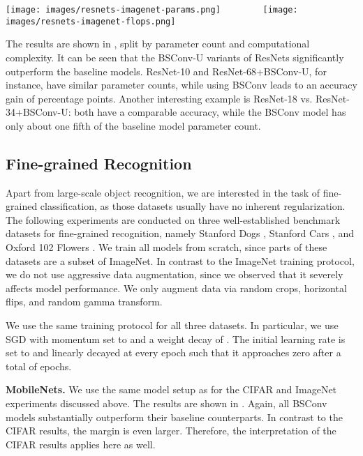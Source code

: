 \documentclass[10pt,twocolumn,letterpaper]{article}
\newcommand{\DCCK}{BSConv\xspace}
\newcommand{\DCCKU}{\DCCK-U\xspace}
\begin{document}
\begin{figure*}
	\center
	\texttt{[image: images/resnets-imagenet-params.png]}~~~~~~~~
	\texttt{[image: images/resnets-imagenet-flops.png]}
	\caption{ResNets on ImageNet.
		For the baseline models, we use ResNet-10/18/26.
		The \DCCK variants are ResNet-10/18/34/68/102.
	}
     \label{fig:resnetsImagenetParamsAndFlops}
\end{figure*}

The results are shown in , split by parameter count and computational complexity.
It can be seen that the \DCCKU variants of ResNets significantly outperform the baseline models.
ResNet-10 and \mbox{ResNet-68+\DCCKU}, for instance, have similar parameter counts, while using \DCCK leads to an accuracy gain of  percentage points.
Another interesting example is ResNet-18 vs. \mbox{ResNet-34+\DCCKU}: both have a comparable accuracy, while the \DCCK model has only about one fifth of the baseline model parameter count.

\subsection{Fine-grained Recognition}
Apart from large-scale object recognition, we are interested in the task of fine-grained classification, as those datasets usually have no inherent regularization.
The following experiments are conducted on three well-established benchmark datasets for fine-grained recognition, namely Stanford Dogs \cite{Khosla2011dogs}, Stanford Cars \cite{KrauseStarkDengFei-Fei_3DRR2013}, and Oxford 102 Flowers \cite{nilsback2008automated}.
We train all models from scratch, since parts of these datasets are a subset of ImageNet.
In contrast to the ImageNet training protocol, we do not use aggressive data augmentation, since we observed that it severely affects model performance.
We only augment data via random crops, horizontal flips, and random gamma transform.

We use the same training protocol for all three datasets.
In particular, we use SGD with momentum set to  and a weight decay of .
The initial learning rate is set to  and linearly decayed at every epoch such that it approaches zero after a total of  epochs.

\textbf{MobileNets.}
We use the same model setup as for the \mbox{CIFAR} and ImageNet experiments discussed above.
The results are shown in .
Again, all \DCCK models substantially outperform their baseline counterparts.
In contrast to the CIFAR results, the margin is even larger.
Therefore, the interpretation of the CIFAR results applies here as well.
\end{document}
